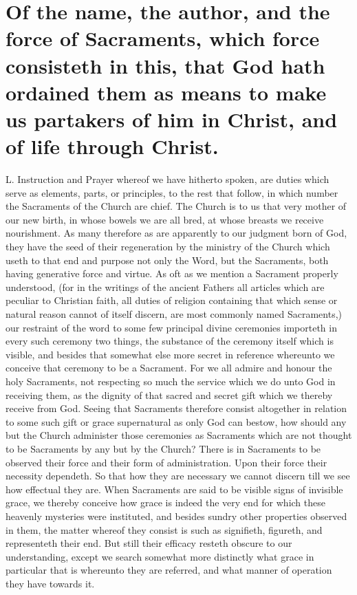 \section*{Of the name, the author, and the force of Sacraments, which force consisteth in this, that God hath ordained them as means to make us partakers of him in Christ, and of life through Christ.}
L. Instruction and Prayer whereof we have hitherto spoken, are duties which serve as elements, parts, or principles, to the rest that follow, in which number the Sacraments of the Church are chief. The Church is to us that very mother of our new birth, in whose bowels we are all bred, at whose breasts we receive nourishment.
As many therefore as are apparently to our judgment born of God, they have the seed of their regeneration by the ministry of the Church which useth to that end and purpose not only the Word, but the Sacraments, both having generative force and virtue.
As oft as we mention a Sacrament properly understood, (for in the writings of the ancient Fathers all articles which are peculiar to Christian faith, all duties of religion containing that which sense or natural reason cannot of itself discern, are most commonly named Sacraments,) our restraint of the word to some few principal divine ceremonies importeth in every such ceremony two things, the substance of the ceremony itself which is visible, and besides that somewhat else more secret in reference whereunto we conceive that ceremony to be a Sacrament. For we all admire and honour the holy Sacraments, not respecting so much the service which we do unto God in receiving them, as the dignity of that sacred and secret gift which we thereby receive from God. Seeing that Sacraments therefore consist altogether in relation to some such gift or grace supernatural as only God can bestow, how should any but the Church administer those ceremonies as Sacraments which are not thought to be Sacraments by any but by the Church?
There is in Sacraments to be observed their force and their form of administration. Upon their force their necessity dependeth. So that how they are necessary we cannot discern till we see how effectual they are. When Sacraments are said to be visible signs of invisible grace, we thereby conceive  how grace is indeed the very end for which these heavenly mysteries were instituted, and besides sundry other properties observed in them, the matter whereof they consist is such as signifieth, figureth, and representeth their end. But still their efficacy resteth obscure to our understanding, except we search somewhat more distinctly what grace in particular that is whereunto they are referred, and what manner of operation they have towards it.
